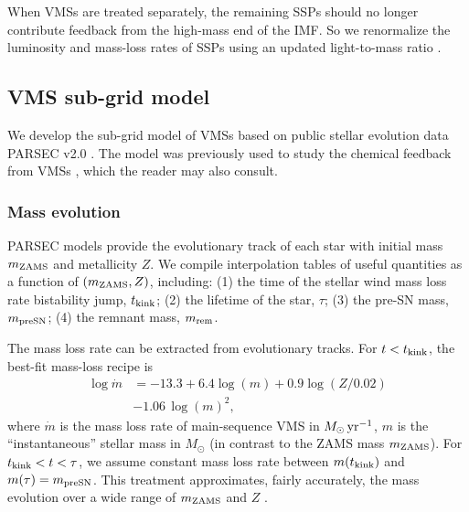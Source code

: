 \documentclass[twocolumn]{aastex631}
\begin{document}
When VMSs are treated separately, the remaining SSPs should no longer contribute feedback from the high-mass end of the IMF. So we renormalize the luminosity and mass-loss rates of SSPs using an updated light-to-mass ratio \citep[similar to][]{GuszejnovHopkinsMa_2017MNRAS.472.2107G}.


\subsection{VMS sub-grid model}
\label{sec:method:singe_star_feedback}

We develop the sub-grid model of VMSs based on public stellar evolution data PARSEC v2.0 \citep{NguyenCostaGirardi_2022A&A...665A.126N,CostaShepherdBressan_2025A&A...694A.193C}. The model was previously  used to study the chemical feedback from VMSs \citep{ShiDaiMurray_2025arXiv251015823S}, which the reader may also consult.

\subsubsection{Mass evolution}
\label{sec:method:singe_star_feedback:mass}


PARSEC models provide the evolutionary track of each star with initial mass $m_{\rm ZAMS}$ and metallicity $Z$. We compile interpolation tables of useful quantities as a function of $(m_{\rm ZAMS}, Z)$, including: (1) the time of the {stellar wind mass loss rate} bistability jump, $t_{\rm kink}$; (2) the lifetime of the star, $\tau$; (3) the pre-SN mass, $m_{\rm preSN}$; (4) the remnant mass, $m_{\rm rem}$. 

The mass loss rate can be extracted from evolutionary tracks. For $t<t_{\rm kink}$, the best-fit mass-loss recipe is 
\begin{align}
    \log \dot m & = -13.3 + 6.4 \log(m) + 0.9 \log(Z/0.02) \nonumber \\ & -1.06\,\log(m)^2, \label{equ:wind_mass_loss_rate}
\end{align}
where $\dot m$ is the mass loss rate of main-sequence VMS in $M_\odot\,{\rm yr}^{-1}$, $m$ is the ``instantaneous'' stellar mass in $M_\odot$ (in contrast to the ZAMS mass $m_{\rm ZAMS}$). For $t_{\rm kink}<t<\tau$, we assume constant mass loss rate between $m(t_{\rm kink})$ and $m(\tau) = m_{\rm preSN}$. This treatment approximates, fairly accurately, the mass evolution over a wide range of $m_{\rm ZAMS}$ and $Z$ \citep[see Figure~4 of][]{ShiDaiMurray_2025arXiv251015823S}.
\end{document}
